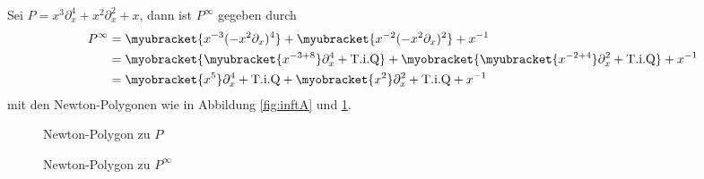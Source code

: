 \begin{exmp}
Sei $P=x^3\partial_x^4+x^2\partial_x^2+x$, dann ist $P^\infty$ gegeben durch
\begin{align*}
P^\infty&=\myubracket{x^{-3}(-x^2\partial_x)^4}
  +\myubracket{x^{-2}(-x^2\partial_x)^2}+x^{-1}
\\&=\myobracket{\myubracket{x^{-3+8}}\partial_x^4+\text{T.i.Q}}
  +\myobracket{\myubracket{x^{-2+4}}\partial_x^2+\text{T.i.Q}} +x^{-1}
\\&=\myobracket{x^{5}}\partial_x^4+\text{T.i.Q}
  +\myobracket{x^{2}}\partial_x^2+\text{T.i.Q} +x^{-1}
\end{align*}
mit den Newton-Polygonen wie in Abbildung \ref{fig:inftA} und
\ref{fig:inftB}.
\begin{figure}[htbp]
  \begin{minipage}[hbt]{0,49\textwidth}
  \begin{center}
  \end{center}
  \caption{Newton-Polygon zu $P$}
    \label{fig:inftA}
  \end{minipage}
  \begin{minipage}[hbt]{0,49\textwidth}
  \begin{center}
  \end{center}
  \caption{Newton-Polygon zu $P^\infty$}
    \label{fig:inftB}
  \end{minipage}
\end{figure}
\end{exmp}

